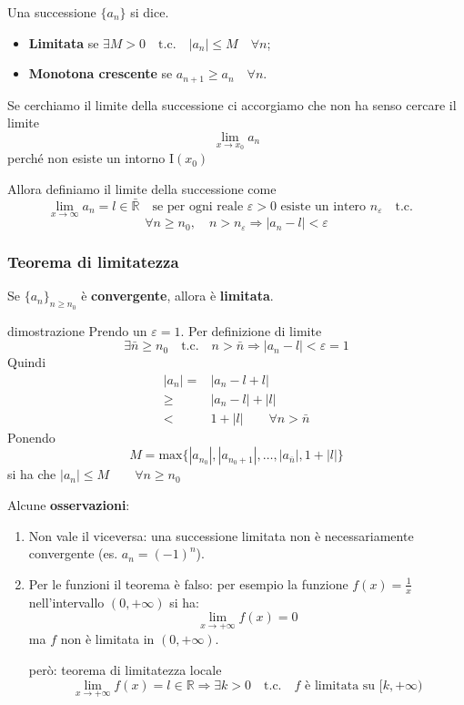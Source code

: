\documentclass[x11names]{article}
\begin{document}
	Una successione $\{a_n\}$ si dice.
	\begin{itemize}
		\item \textbf{Limitata} se $\exists M>0 \quad \text{t.c.} \quad |a_n| \leq M \quad \forall n$;
		\item \textbf{Monotona crescente} se $a_{n+1} \geq  a_n \quad \forall n$.
	\end{itemize} 
	
	Se cerchiamo il limite della successione ci accorgiamo che non ha senso cercare il limite
	\[
	\lim_{x \to x_0}a_n
	\]
	perché non esiste un intorno I$(x_0)$
	
	Allora definiamo il limite della successione come
	\[
	\lim_{x \to \infty}a_n = l \in \bar{\mathbb{R}} \quad \text{se per ogni reale } \varepsilon > 0 \text{ esiste un intero } n_\varepsilon \quad \text{t.c.} \quad 
	\]
	\[
	\forall n \geq n_0, \quad n > n_\varepsilon \Longrightarrow |a_n - l| < \varepsilon
	\]
	\begin{center}
		\colorbox{myred}{\begin{minipage}{5.75in}
				\begin{redes}{}
					\subsubsection{Teorema di limitatezza}
					Se $\{a_n\}_{n\geq n_0}$ è \textbf{convergente}, allora è \textbf{limitata}.
				\end{redes}
		\end{minipage}}        
	\end{center}
	\begin{es}{dimostrazione}
		Prendo un $\varepsilon = 1$. Per definizione di limite
		\[
		\exists \bar{n} \geq n_0 \quad \text{t.c.} \quad n > \bar{n} \Longrightarrow |a_n - l| < \varepsilon = 1
		\]
		Quindi
		\begin{align*}
			|a_n| =& |a_n -l +l| \\
			 \geq& |a_n - l| + |l| \\
			<&  1 + |l| \qquad \forall n > \bar{n}
		\end{align*}
		Ponendo
		\[
		M = \text{max}\{|a_{n_0}|, |a_{n_0 +1}|, \dots, |a_{\bar{n}}|, 1 + |l|\}
		\]
		si ha che $|a_n| \leq M \qquad \forall n \geq n_0$
	\end{es}
	Alcune \textbf{osservazioni}:
	\begin{enumerate}
		\item Non vale il viceversa: una successione limitata non è necessariamente convergente (es. $a_n = (-1)^n$).
		\item Per le funzioni il teorema è falso: per esempio la funzione $f(x) = \frac{1}{x}$ nell'intervallo $(0,+\infty)$ si ha:
		\[
		\lim_{x \to + \infty}f(x) = 0
		\]
		ma $f$ non è limitata in $(0,+\infty)$.
		\begin{es}{però: teorema di limitatezza locale}
			\[
			\lim_{x \to +\infty}f(x) = l \in \mathbb{R} \Longrightarrow \exists k>0 \quad \text{t.c.} \quad f \text{ è limitata su } [k,+\infty)
			\]
		\end{es}
	\end{enumerate}
	
\end{document}
